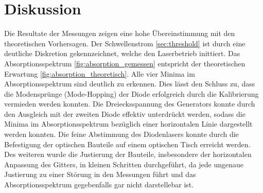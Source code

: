 \section{Diskussion}
\label{sec:Diskussion}
Die Resultate der Messungen zeigen eine hohe Übereinstimmung mit den theoretischen Vorhersagen.
Der Schwellenstrom \ref{sec:threshold} ist durch eine deutliche Diskretion gekennzeichnet, 
welche den Laserbetrieb inittiert.
Das Absorptionsspektrum \ref{fig:absorption_gemessen} entspricht der theoretischen Erwartung \ref{fig:absorption_theoretisch}.
Alle vier Minima im Absorptionsspektrum sind deutlich zu erkennen.
Dies lässt den Schluss zu, dass die Modensprünge (Mode-Hopping) der Diode erfolgreich durch die Kalibrierung vermieden werden konnten.
Die Dreiecksspannung des Generators konnte durch den Ausgleich mit der zweiten Diode effektiv unterdrückt werden, 
sodass die Minima im Absorptionsspektrum bezüglich einer horizontalen Linie dargestellt werden konnten.
Die feine Abstimmung des Diodenlasers konnte durch die Befestigung der optischen Bauteile auf einem optischen Tisch erreicht werden.
Des weiteren wurde die Justierung der Bauteile, insbesondere der horizontalen Anpassung des Gitters, in kleinen Schritten durchgeführt, 
da jede ungenaue Justierung zu einer Störung in den Messungen führt und das Absorptionsspektrum gegebenfalls gar nicht darstellebar ist.

